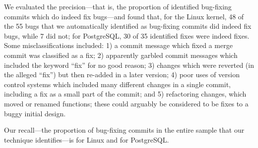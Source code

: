 \begin{table}[tbh]
\centering
\small
{}
\caption{\label{tbl-confusion}Confusion matrices}
\end{table}


We evaluated the precision---that is, the proportion of identified bug-fixing
commits which do indeed fix bugs---and found that, for the Linux kernel, 48 of
the 55 bugs that we automatically identified as bug-fixing commits did indeed
fix bugs, while 7 did not; for PostgreSQL, 30 of 35 identified fixes were indeed
fixes. Some misclassifications included: 1) a commit message which fixed a merge
commit was classified as a fix; 2) apparently garbled commit messages which
included the keyword ``fix'' for no good reason; 3) changes which were reverted
(in the alleged ``fix'') but then re-added in a later version; 4) poor uses of
version control systems which included many different changes in a single
commit, including a fix as a small part of the commit; and 5) refactoring
changes, which moved or renamed functions; these could arguably be considered
to be fixes to a buggy initial design.

Our recall---the proportion of bug-fixing commits in the entire sample that our
technique identifies---is \linuxR for Linux and \postR for
PostgreSQL.
